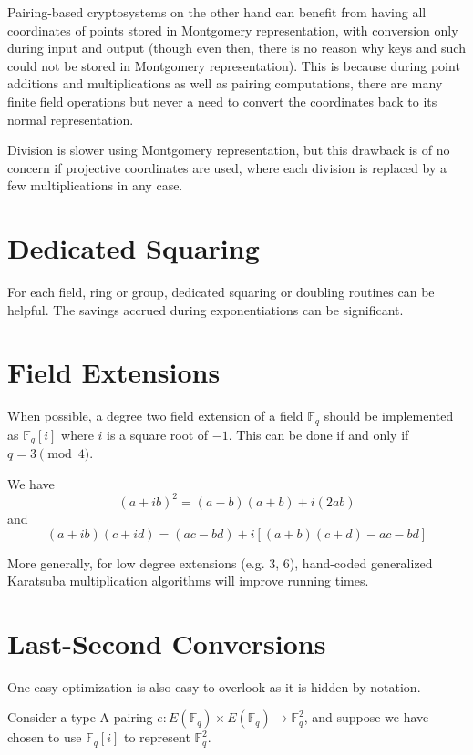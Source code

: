 Pairing-based cryptosystems on the other hand can benefit from having
all coordinates of points stored in Montgomery representation, with conversion
only during input and output (though even then, there is no reason why keys
and such could not be stored in Montgomery representation). This is because
during point additions and multiplications as well as pairing computations,
there are many finite field operations but never a need to convert the
coordinates back to its normal representation.

Division is slower using Montgomery representation, but this drawback is
of no concern if projective coordinates are used, where each division is
replaced by a few multiplications in any case.

\section{Dedicated Squaring}

For each field, ring or group, dedicated squaring or doubling routines
can be helpful. The savings accrued during exponentiations can be significant.

\section{Field Extensions}

When possible, a degree two field extension of a field $\mathbb{F}_q$
should be implemented as $\mathbb{F}_q[i]$ where $i$ is a square root of $-1$.
This can be done if and only if $q = 3 \pmod{4}$.

We have
\[ (a + i b)^2 = (a - b)(a + b) + i (2 a b) \]
and
\[ (a + i b)(c + i d) = (ac - bd) + i[(a + b)(c + d) - ac - bd] \]

More generally, for low degree extensions (e.g. 3, 6),
hand-coded generalized Karatsuba multiplication algorithms \cite{wpkaratsuba}
will improve running times.

\section{Last-Second Conversions}

One easy optimization is also easy to overlook as it is hidden by
notation.

Consider a type A pairing $e : E(\mathbb{F}_q) \times E(\mathbb{F}_q)
\rightarrow \mathbb{F}_q^2$, and suppose we have chosen to
use $\mathbb{F}_q [i]$ to represent $\mathbb{F}_q^2$.

